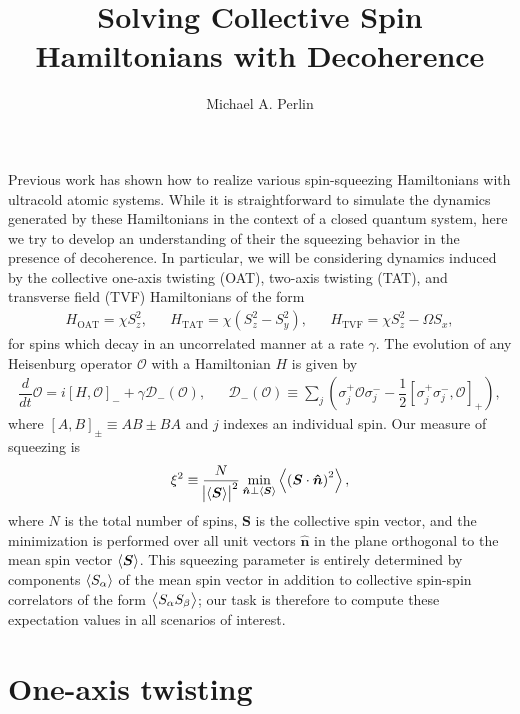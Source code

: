 \documentclass[aps,notitlepage,nofootinbib,11pt]{revtex4-1}
\renewcommand{\t}{\text} %
\newcommand{\f}[2]{\dfrac{#1}{#2}} %
\newcommand{\p}[1]{\left(#1\right)} %
\renewcommand{\sp}[1]{\left[#1\right]} %
\renewcommand{\v}{\bm} %
\newcommand{\uv}[1]{\v{\hat{#1}}} %
\renewcommand{\c}{\cdot} %
\newcommand{\bk}{\Braket} %
\newcommand{\D}{\mathcal{D}}
\renewcommand{\O}{\mathcal{O}}
\newcommand{\1}{\mathds{1}}
\begin{document}
\title{Solving Collective Spin Hamiltonians with Decoherence}

\author{Michael A. Perlin}

\maketitle

Previous work has shown how to realize various spin-squeezing
Hamiltonians with ultracold atomic systems.  While it is
straightforward to simulate the dynamics generated by these
Hamiltonians in the context of a closed quantum system, here we try to
develop an understanding of their the squeezing behavior in the
presence of decoherence.  In particular, we will be considering
dynamics induced by the collective one-axis twisting (OAT), two-axis
twisting (TAT), and transverse field (TVF) Hamiltonians of the form
\begin{align}
  H_{\t{OAT}} = \chi S_z^2,
  &&
  H_{\t{TAT}} = \chi \p{S_z^2 - S_y^2},
  &&
  H_{\t{TVF}} = \chi S_z^2 - \Omega S_x,
\end{align}
for spins which decay in an uncorrelated manner at a rate $\gamma$.
The evolution of any Heisenburg operator $\O$ with a Hamiltonian $H$
is given by
\begin{align}
  \f{d}{dt} \O
  = i\sp{H,\O}_- + \gamma\D_-\p{\O},
  &&
  \D_-\p{\O} \equiv \sum_j\p{\sigma_j^+\O\sigma_j^-
    - \f12\sp{\sigma_j^+\sigma_j^-,\O}_+},
  \label{eq:EOM}
\end{align}
where $\sp{A,B}_\pm\equiv AB\pm BA$ and $j$ indexes an individual
spin.  Our measure of squeezing is
\begin{align}
  \xi^2 \equiv \f{N}{\abs{\bk{\v S}}^2}
  \min_{\uv n\perp\bk{\v S}} \bk{\p{\v S\c\uv n}^2},
  \label{eq:squeezing}
\end{align}
where $N$ is the total number of spins, $\v S$ is the collective spin
vector, and the minimization is performed over all unit vectors
$\uv n$ in the plane orthogonal to the mean spin vector $\bk{\v S}$.
This squeezing parameter is entirely determined by components
$\bk{S_\alpha}$ of the mean spin vector in addition to collective
spin-spin correlators of the form $\bk{S_\alpha S_\beta}$; our task is
therefore to compute these expectation values in all scenarios of
interest.


\section{One-axis twisting}
\end{document}
